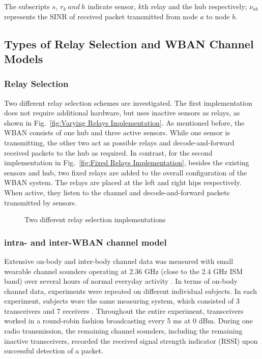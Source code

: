 \documentclass[12pt,draftcls,a4paper,onecolumn,journal]{IEEEtran}
\begin{document}
The subscripts $s,~r_k~and~h$ indicate sensor, $k$th relay and the hub respectively; $\nu_{ab}$ represents the SINR of received packet transmitted from node $a$ to node $b$.

\subsection{Types of Relay Selection and WBAN Channel Models}
\label{sec:relset}
\subsubsection{Relay Selection}
Two different relay selection schemes are investigated. The first implementation does not require additional hardware, but uses inactive sensors as relays, as shown in Fig.~\ref{fig:Varying Relays Implementation}. As mentioned before, the WBAN consists of one hub and three active sensors. While one sensor is transmitting, the other two act as possible relays and decode-and-forward received packets to the hub as required. In contrast, for the second implementation in Fig.~\ref{fig:Fixed Relays Implementation}, besides the existing sensors and hub, two fixed relays are added to the overall configuration of the WBAN system. The relays are placed at the left and right hips respectively. When active, they listen to the channel and decode-and-forward packets transmitted by sensors.
\begin{figure}[]
\centering
{}
\caption{Two different relay selection implementations}
\label{fig:relay selection}
\end{figure}


\subsubsection{intra- and inter-WBAN channel model}
Extensive on-body and inter-body channel data was measured with small wearable channel sounders operating at 2.36 GHz (close to the 2.4 GHz ISM band) over several hours of normal everyday activity \cite{NICTAdata}. In terms of on-body channel data, experiments were repeated on different individual subjects. In each experiment, subjects wore the same measuring system, which consisted of 3 transceivers and 7 receivers \cite{NICTAdata}\cite{Dong2012}. Throughout the entire experiment, transceivers worked in a round-robin fashion broadcasting every 5 ms at 0 dBm. During one radio transmission, the remaining channel sounders, including the remaining inactive transceivers, recorded the received signal strength indicator (RSSI) upon successful detection of a packet.
\end{document}
